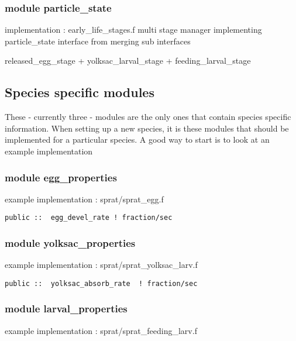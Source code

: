 \subsubsection{module particle\_state}                             
implementation : early\_life\_stages.f
multi stage manager implementing particle\_state interface 
from merging sub interfaces

released\_egg\_stage + yolksac\_larval\_stage + feeding\_larval\_stage  


\subsection{Species specific modules}

These - currently three - modules are the only ones that contain species specific information.
When setting up a new species, it is these modules that should be implemented for a 
particular species. A good way to start is to look at an example implementation

\subsubsection{module egg\_properties}                          
example implementation : sprat/sprat\_egg.f   
\begin{verbatim}
public ::  egg_devel_rate ! fraction/sec
\end{verbatim}

\subsubsection{module yolksac\_properties}                     
example implementation : sprat/sprat\_yolksac\_larv.f
\begin{verbatim}
public ::  yolksac_absorb_rate  ! fraction/sec
\end{verbatim}
\subsubsection{module larval\_properties}                       
example implementation : sprat/sprat\_feeding\_larv.f

